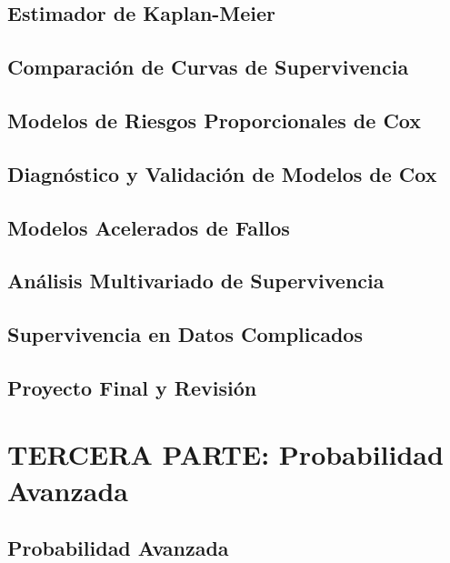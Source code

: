 \documentclass{report}
\begin{document}
\chapter{Estimador de Kaplan-Meier}


\chapter{Comparación de Curvas de Supervivencia}


\chapter{Modelos de Riesgos Proporcionales de Cox}


\chapter{Diagnóstico y Validación de Modelos de Cox}


\chapter{Modelos Acelerados de Fallos}


\chapter{Análisis Multivariado de Supervivencia}


\chapter{Supervivencia en Datos Complicados}


\chapter{Proyecto Final y Revisión}


\part{TERCERA PARTE: Probabilidad Avanzada}

\chapter{Probabilidad Avanzada}

\end{document}
